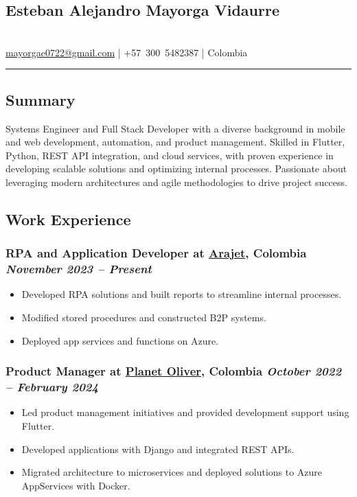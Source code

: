 \documentclass[a4paper,10pt]{article}
\begin{document}
\pagestyle{empty}

\begin{center}
  \section*{\LARGE Esteban Alejandro Mayorga Vidaurre} \\
  \href{mailto:mayorgae0722@gmail.com}{mayorgae0722@gmail.com} \quad | \quad +57~300~5482387 \quad | \quad Colombia
\end{center}

\hrule
\vspace{4pt}

\subsection*{Summary}
Systems Engineer and Full Stack Developer with a diverse background in mobile and web development, automation, and product management. Skilled in Flutter, Python, REST API integration, and cloud services, with proven experience in developing scalable solutions and optimizing internal processes. Passionate about leveraging modern architectures and agile methodologies to drive project success.

\subsection*{Work Experience}

\subsubsection*{%
  \textbf{RPA and Application Developer} at \href{https://www.linkedin.com/company/arajet/}{Arajet}, Colombia
  \hfill
  \textit{November 2023 -- Present}
}
\begin{itemize}
  \item Developed RPA solutions and built reports to streamline internal processes.
  \item Modified stored procedures and constructed B2P systems.
  \item Deployed app services and functions on Azure.
\end{itemize}

\subsubsection*{%
  \textbf{Product Manager} at \href{https://startupslatam.com/planet-oliver-la-startup-colombiana-que-con-tecnologia-elimina-el-desperdicio-de-comida-alcanza-los-12-mil-usuarios/}{Planet Oliver}, Colombia
  \hfill
  \textit{October 2022 -- February 2024}
}
\begin{itemize}
  \item Led product management initiatives and provided development support using Flutter.
  \item Developed applications with Django and integrated REST APIs.
  \item Migrated architecture to microservices and deployed solutions to Azure AppServices with Docker.
\end{itemize}
\end{document}
